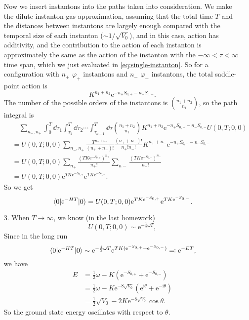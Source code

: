 \documentclass[hyperref, a4paper]{article}
\newcommand*{\ii}{\mathrm{i}}
\newcommand*{\ee}{\mathrm{e}}
\begin{document}
\begin{itemize}
Now we insert instantons into the paths taken into consideration.
We make the dilute instanton gas approximation,
assuming that the total time $T$ and the distances between instantons 
are largely enough compared with the temporal size of each instanton ($\sim 1 / \sqrt{V_0}$),
and in this case, action has additivity,
and the contribution to the action of each instanton 
is approximately the same as the action of the instanton with
the $-\infty < \tau < \infty$ time span,
which we just evaluated in \eqref{eq:single-instanton}.
So for a configuration with $n_+$ $\varphi_+$ instantons and $n_-$ $\varphi_-$ instantons,
the total saddle-point action is 
\[
    K^{n_1 + n_2} \ee^{- n_+ S_{0, +} - n_- S_{0, -}}.
\]
The number of the possible orders of the instantons is $\binom{n_1 + n_2}{n_1}$,
so the path integral is 
\[
    \begin{aligned}
        &\quad \sum_{n_-, n_+} 
        \int_{0}^T \dd{\tau_1} \int_{\tau_1}^T \dd{\tau_2} \cdots \int_{\tau_{n-1}}^T \dd{\tau}
        \binom{n_1 + n_2}{n_1} K^{n_1 + n_2} \ee^{- n_+ S_{0, +} - n_- S_{0, -}}
        U(0, T; 0, 0) \\
        &= U(0, T; 0, 0) \sum_{n_-, n_+} \frac{T^{n_+ + n_-}}{(n_+ + n_-) !} 
        \frac{(n_+ + n_-) !}{n_+! n_-!} 
        K^{n_+ + n_-} \ee^{- n_+ S_{0, +} - n_- S_{0, -}} \\
        &= U(0, T; 0, 0) \sum_{n_+} \frac{(T K \ee^{- S_{0, +}})^{n_+}}{n_+!} 
        \sum_{n-} \frac{(T K \ee^{- S_{0, -}})^{n_-}}{n_-!} \\
        &= U(0, T; 0, 0) \ee^{TK \ee^{- S_{0,+}}} \ee^{TK \ee^{- S_{0,-}}}.
    \end{aligned}
\]
So we get 
\begin{equation}
    \expval{\ee^{- H T}}{0} = U(0, T; 0, 0) \ee^{TK \ee^{- S_{0,+}}} \ee^{TK \ee^{- S_{0,-}}}.
\end{equation}

\item[3.] When $T \to \infty$,
we know (in the last homework) 
\begin{equation}
    U(0, T; 0, 0) \sim \ee^{- \frac{1}{2} \omega T},
\end{equation}
Since in the long run 
\begin{equation}
    \expval{\ee^{- HT}}{0} \sim \ee^{- \frac{1}{2} \omega T} \ee^{TK (\ee^{- S_{0, +}} + \ee^{- S_{0, -}})} 
    \eqqcolon \ee^{- E T},
\end{equation}
we have 
\begin{equation}
    \begin{aligned}
        E &= \frac{1}{2} \omega - K ( \ee^{- S_{0, +}} + \ee^{- S_{0, -}} ) \\
        &= \frac{1}{2} \omega - K \ee^{- 8 \sqrt{V_0}} ( \ee^{\ii \theta} + \ee^{- \ii \theta} ) \\
        &= \frac{1}{2} \sqrt{V_0} - 2 K \ee^{- 8 \sqrt{V_0}} \cos\theta.
    \end{aligned}
\end{equation}
So the ground state energy oscillates with respect to $\theta$.

\end{itemize}
\end{document}
